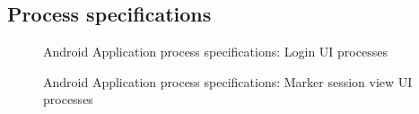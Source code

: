 \subsection{Process specifications}
\begin{figure}[H]
\centering	
{}
\caption{Android Application process specifications: Login UI processes}
\end{figure}

\begin{figure}[H]
\centering	
{}
\caption{Android Application process specifications: Marker session view UI processes}
\end{figure}

